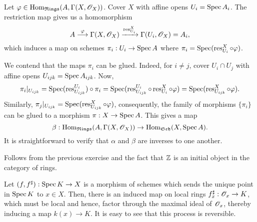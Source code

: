 \begin{exercise} %
    Let $\varphi\in\operatorname{Hom}_{\mathfrak{Rings}}(A,\Gamma(X,\mathscr{O}_X))$. Cover $X$ with affine opens $U_i = \operatorname{Spec} A_i$. The restriction map gives us a homomorphism 
    \begin{equation*}
        A\stackrel{\varphi}{\longrightarrow}\Gamma(X,\mathscr{O}_X)\xrightarrow{\operatorname{res}^{X}_{U_i}}\Gamma(U_i,\mathscr{O}_X) = A_i,
    \end{equation*}
    which induces a map on schemes $\pi_i: U_i\to\operatorname{Spec} A$ where $\pi_i = \operatorname{Spec}(\operatorname{res}^X_{U_i}\circ\varphi)$. 

    We contend that the maps $\pi_i$ can be glued. Indeed, for $i\ne j$, cover $U_i\cap U_j$ with affine opens $U_{ijk} = \operatorname{Spec} A_{ijk}$. Now, 
    \begin{equation*}
        \pi_i|_{U_{ijk}} = \operatorname{Spec}(\operatorname{res}^{U_i}_{U_{ijk}})\circ\pi_i = \operatorname{Spec}(\operatorname{res}^{U_i}_{U_{ijk}}\circ\operatorname{res}^X_{U_i}\circ\varphi) = \operatorname{Spec}(\operatorname{res}^{X}_{U_{ijk}}\circ\varphi).
    \end{equation*}
    Similarly, $\pi_j|_{U_{ijk}} = \operatorname{Spec}(\operatorname{res}^X_{U_{ijk}}\circ\varphi)$, consequently, the family of morphisms $\{\pi_i\}$ can be glued to a morphism $\pi: X\to\operatorname{Spec} A$. This gives a map 
    \begin{equation*}
        \beta:\operatorname{Hom}_{\mathfrak{Rings}}(A,\Gamma(X,\mathscr{O}_X))\to\operatorname{Hom}_{\mathfrak{Sch}}(X,\operatorname{Spec} A).
    \end{equation*}
    It is straightforward to verify that $\alpha$ and $\beta$ are inverses to one another.
\end{exercise}

\begin{exercise}
    Follows from the previous exercise and the fact that $\mathbb{Z}$ is an initial object in the category of rings.
\end{exercise}

\setcounter{exercise}{6}
\begin{exercise}
    Let $(f,f^\sharp): \operatorname{Spec} K\to X$ is a morphism of schemes which sends the unique point in $\operatorname{Spec} K$ to $x\in X$. Then, there is an induced map on local rings $f^\sharp_x: \mathscr{O}_x\to K$, which must be local and hence, factor through the maximal ideal of $\mathscr{O}_x$, thereby inducing a map $k(x)\to K$. It is easy to see that this process is reversible.
\end{exercise}

